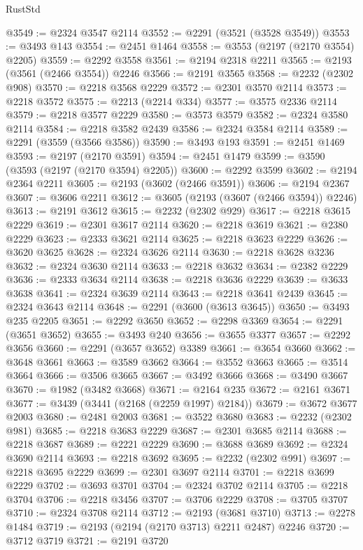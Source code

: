 \begin{lexlean}{RustStd}
\begin{coremodule}
@3549 := @2324 @3547 @2114
@3552 := @2291 (@3521 (@3528 @3549))
@3553 := @3493 @143
@3554 := @2451 @1464
@3558 := @3553 (@2197 (@2170 @3554) @2205)
@3559 := @2292 @3558
@3561 := @2194 @2318 @2211
@3565 := @2193 (@3561 (@2466 @3554)) @2246
@3566 := @2191 @3565
@3568 := @2232 (@2302 @908)
@3570 := @2218 @3568 @2229
@3572 := @2301 @3570 @2114
@3573 := @2218 @3572
@3575 := @2213 (@2214 @334)
@3577 := @3575 @2336 @2114
@3579 := @2218 @3577 @2229
@3580 := @3573 @3579
@3582 := @2324 @3580 @2114
@3584 := @2218 @3582 @2439
@3586 := @2324 @3584 @2114
@3589 := @2291 (@3559 (@3566 @3586))
@3590 := @3493 @193
@3591 := @2451 @1469
@3593 := @2197 (@2170 @3591)
@3594 := @2451 @1479
@3599 := @3590 (@3593 (@2197 (@2170 @3594) @2205))
@3600 := @2292 @3599
@3602 := @2194 @2364 @2211
@3605 := @2193 (@3602 (@2466 @3591))
@3606 := @2194 @2367
@3607 := @3606 @2211
@3612 := @3605 (@2193 (@3607 (@2466 @3594)) @2246)
@3613 := @2191 @3612
@3615 := @2232 (@2302 @929)
@3617 := @2218 @3615 @2229
@3619 := @2301 @3617 @2114
@3620 := @2218 @3619
@3621 := @2380 @2229
@3623 := @2333 @3621 @2114
@3625 := @2218 @3623 @2229
@3626 := @3620 @3625
@3628 := @2324 @3626 @2114
@3630 := @2218 @3628 @3236
@3632 := @2324 @3630 @2114
@3633 := @2218 @3632
@3634 := @2382 @2229
@3636 := @2333 @3634 @2114
@3638 := @2218 @3636 @2229
@3639 := @3633 @3638
@3641 := @2324 @3639 @2114
@3643 := @2218 @3641 @2439
@3645 := @2324 @3643 @2114
@3648 := @2291 (@3600 (@3613 @3645))
@3650 := @3493 @235 @2205
@3651 := @2292 @3650
@3652 := @2298 @3369
@3654 := @2291 (@3651 @3652)
@3655 := @3493 @240
@3656 := @3655 @3377
@3657 := @2292 @3656
@3660 := @2291 (@3657 @3652) @3389
@3661 := @3654 @3660
@3662 := @3648 @3661
@3663 := @3589 @3662
@3664 := @3552 @3663
@3665 := @3514 @3664
@3666 := @3506 @3665
@3667 := @3492 @3666
@3668 := @3490 @3667
@3670 := @1982 (@3482 @3668)
@3671 := @2164 @235
@3672 := @2161 @3671
@3677 := @3439 (@3441 (@2168 (@2259 @1997) @2184))
@3679 := @3672 @3677 @2003
@3680 := @2481 @2003
@3681 := @3522 @3680
@3683 := @2232 (@2302 @981)
@3685 := @2218 @3683 @2229
@3687 := @2301 @3685 @2114
@3688 := @2218 @3687
@3689 := @2221 @2229
@3690 := @3688 @3689
@3692 := @2324 @3690 @2114
@3693 := @2218 @3692
@3695 := @2232 (@2302 @991)
@3697 := @2218 @3695 @2229
@3699 := @2301 @3697 @2114
@3701 := @2218 @3699 @2229
@3702 := @3693 @3701
@3704 := @2324 @3702 @2114
@3705 := @2218 @3704
@3706 := @2218 @3456
@3707 := @3706 @2229
@3708 := @3705 @3707
@3710 := @2324 @3708 @2114
@3712 := @2193 (@3681 @3710)
@3713 := @2278 @1484
@3719 := @2193 (@2194 (@2170 @3713) @2211 @2487) @2246
@3720 := @3712 @3719
@3721 := @2191 @3720

\end{coremodule}
\end{lexlean}

